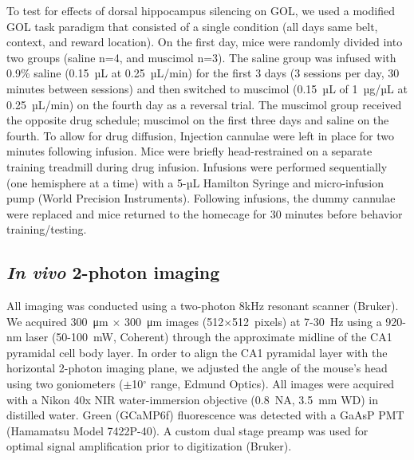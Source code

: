 To test for effects of dorsal hippocampus silencing on GOL, we used a modified GOL task paradigm that consisted of a single condition (all days same belt, context, and reward location). On the first day, mice were randomly divided into two groups (saline n=4, and muscimol n=3). The saline group was infused with 0.9\% saline (0.15~µL at 0.25~µL/min) for the first 3 days (3 sessions per day, 30 minutes between sessions) and then switched to muscimol (0.15~µL of 1~µg/µL at 0.25~µL/min) on the fourth day as a reversal trial. The muscimol group received the opposite drug schedule; muscimol on the first three days and saline on the fourth. To allow for drug diffusion, Injection cannulae were left in place for two minutes following infusion. Mice were briefly head-restrained on a separate training treadmill during drug infusion. Infusions were performed sequentially (one hemisphere at a time) with a 5-µL Hamilton Syringe and micro-infusion pump (World Precision Instruments). Following infusions, the dummy cannulae were replaced and mice returned to the homecage for 30 minutes before behavior training/testing.

\subsection{\emph{In vivo} 2-photon imaging}
All imaging was conducted using a two-photon 8kHz resonant scanner (Bruker). We acquired 300~μm $\times$ 300~μm images (512$\times$512~pixels) at 7-30~Hz using a 920-nm laser (50-100~mW, Coherent) through the approximate midline of the CA1 pyramidal cell body layer.  In order to align the CA1 pyramidal layer with the horizontal 2-photon imaging plane, we adjusted the angle of the mouse's head using two goniometers ($\pm$10$^{\circ}$ range, Edmund Optics).  All images were acquired with a Nikon 40x NIR water-immersion objective (0.8~NA, 3.5~mm WD) in distilled water. Green (GCaMP6f) fluorescence was detected with a GaAsP PMT (Hamamatsu Model 7422P-40). A custom dual stage preamp was used for optimal signal amplification prior to digitization (Bruker). 


